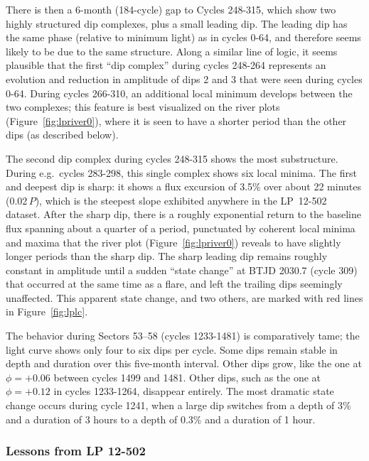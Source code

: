 \documentclass[11pt,twocolumn,tighten]{aastex63}
\begin{document}
There is then a 6-month (184-cycle) gap to Cycles 248-315, which show
two highly structured dip complexes, plus a small leading dip.  The
leading dip has the same phase (relative to minimum light) as in
cycles 0-64, and therefore seems likely to be due to the same
structure.  Along a similar line of logic, it seems plausible that the
first ``dip complex'' during cycles 248-264 represents an evolution
and reduction in amplitude of dips 2 and 3 that were seen during
cycles 0-64.  During cycles 266-310, an additional local minimum
develops between the two complexes; this feature is best visualized on
the river plots (Figure~\ref{fig:lpriver0}), where it is seen to have
a shorter period than the other dips (as described below).

The second dip complex during cycles 248-315 shows the most
substructure.  During e.g.~cycles 283-298, this single complex shows
six local minima.  The first and deepest dip is sharp: it shows a flux
excursion of 3.5\% over about 22 minutes (0.02\,$P$), which is the
steepest slope exhibited anywhere in the LP~12-502 dataset.  After the
sharp dip, there is a roughly exponential return to the baseline flux
spanning about a quarter of a period, punctuated by coherent local
minima and maxima that the river plot (Figure~\ref{fig:lpriver0})
reveals to have slightly longer periods than the sharp dip.  The sharp
leading dip remains roughly constant in amplitude until a sudden
``state change'' at BTJD 2030.7 (cycle 309) that occurred at the same
time as a flare, and left the trailing dips seemingly unaffected.
This apparent state change, and two others, are marked with red lines
in Figure~\ref{fig:lplc}.

The behavior during Sectors 53--58 (cycles 1233-1481) is comparatively tame; the light curve shows
only four to six dips per cycle.  Some dips remain stable in depth and
duration over this five-month interval.  Other dips grow, like the one
at $\phi = +0.06$ between cycles 1499 and 1481.  Other dips, such as
the one at $\phi = +0.12$ in cycles 1233-1264, disappear entirely.
The most dramatic state change occurs during cycle 1241, when a large
dip switches from a depth of 3\% and a duration of 3 hours to a depth
of 0.3\% and a duration of 1 hour.


\subsubsection{Lessons from LP 12-502}
\label{subsec:lplessons}
\end{document}
